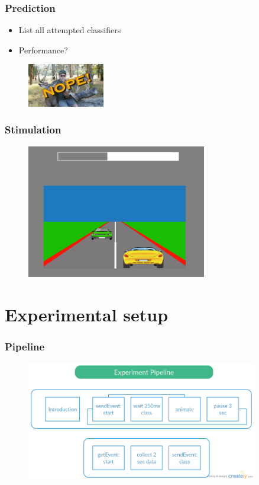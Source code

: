 \documentclass{beamer}
\begin{document}
\begin{frame}
  \frametitle{Prediction}

  \begin{itemize}
    \item List all attempted classifiers
    \item Performance?
  \end{itemize}

  \begin{figure}[H]
    \includegraphics[width=0.3\textwidth, right]{chucktesta.jpeg}
  \end{figure}

\end{frame}

\begin{frame}
  \frametitle{Stimulation}

  \begin{figure}
    \includegraphics[width=0.7\textwidth]{brain_racer.png}
  \end{figure}

\end{frame}

\section{Experimental setup}

\begin{frame}
  \frametitle{Pipeline}

  \begin{figure}
    \centering
    \includegraphics[width=0.9\textwidth]{brain_racer_pipeline.png}
  \end{figure}
\end{frame}
\end{document}
